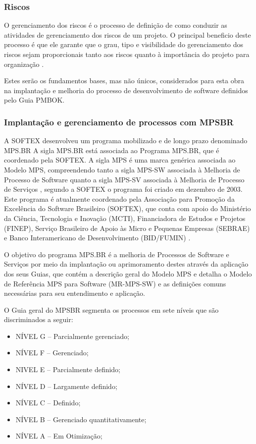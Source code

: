 \documentclass{acm_proc_article-sp}
\begin{document}
\subsubsection*{Riscos}
O gerenciamento dos riscos é o processo de definição de como conduzir as atividades de gerenciamento dos riscos de um projeto. O principal beneficio deste processo é que ele garante que o grau, tipo e visibilidade do gerenciamento dos riscos sejam proporcionais tanto aos riscos quanto à importância do projeto para organização \cite{pmbok:nAgil}.


Estes serão os fundamentos bases, mas não únicos, considerados para esta obra na implantação e melhoria do processo de desenvolvimento de software definidos pelo Guia PMBOK. 

\subsubsection{Implantação e gerenciamento de processos com MPSBR}
A SOFTEX desenvolveu um programa mobilizado e de longo prazo denominado MPS.BR  A sigla
MPS.BR está associada ao Programa MPS.BR, que é coordenado pela SOFTEX. A sigla MPS é uma
marca genérica associada ao Modelo MPS, compreendendo tanto a sigla MPS-SW associada à
Melhoria de Processo de Software quanto a sigla MPS-SV associada à Melhoria de Processo de
Serviços \cite{mpsbr:nAgil}, segundo a SOFTEX o programa foi criado em dezembro de 2003. Este programa é atualmente coordenado pela Associação para Promoção da Excelência do Software Brasileiro (SOFTEX), que conta com apoio do Ministério da Ciência, Tecnologia e Inovação (MCTI), Financiadora de Estudos e Projetos (FINEP), Serviço Brasileiro de Apoio às Micro e Pequenas Empresas (SEBRAE) e Banco Interamericano de Desenvolvimento (BID/FUMIN) \cite{mpsbr:nAgil}.

O objetivo do programa MPS.BR é a melhoria de Processos de Software e Serviços por meio da implantação ou aprimoramento destes através da aplicação dos seus Guias, que contém a descrição geral do Modelo MPS e detalha o Modelo
de Referência MPS para Software (MR-MPS-SW) e as definições comuns necessárias para seu entendimento e aplicação. 

O Guia geral do MPSBR segmenta os processos em sete níveis que são discriminados a seguir:

\begin{itemize}
\item NÍVEL G – Parcialmente gerenciado;
\item NÍVEL F – Gerenciado;
\item NIVEL E – Parcialmente definido;
\item NÍVEL D – Largamente definido;
\item NÍVEL C – Definido;
\item NÍVEL B – Gerenciado quantitativamente;
\item NÍVEL A – Em Otimização;
\end{itemize}
\end{document}
